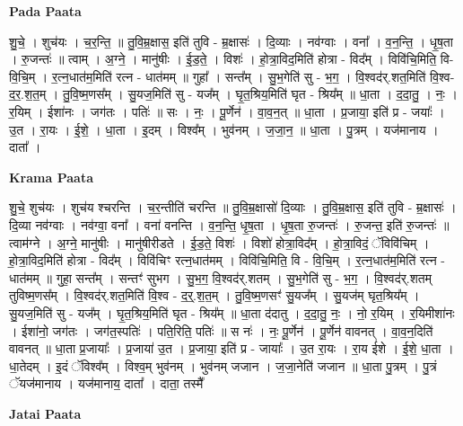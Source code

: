 \documentclass[17pt]{extarticle}
\begin{document}
\textbf{Pada Paata} \newline

शु॒चे॒ । शुच॑यः । च॒र॒न्ति॒ ॥ तु॒वि॒म्र॒क्षास॒ इति॑ तुवि - म्र॒क्षासः॑ । दि॒व्याः । नव॑ग्वाः । वना᳚ । व॒न॒न्ति॒ । धृ॒ष॒ता । रु॒जन्तः॑ ॥ त्वाम् । अ॒ग्ने॒ । मानु॑षीः । ई॒ड॒ते॒ । विशः॑ । हो॒त्रा॒विद॒मिति॑ होत्रा - विद᳚म् । विवि॑चि॒मिति॒ वि-वि॒चि॒म् । र॒त्न॒धात॑म॒मिति॑ रत्न - धात॑मम् ॥ गुहा᳚ । सन्त᳚म् । सु॒भ॒गेति॑ सु - भ॒ग॒ । वि॒श्वद॑र्.शत॒मिति॑ वि॒श्व-द॒र॒.श॒त॒म् । तु॒वि॒ष्म॒णस᳚म् । सु॒यज॒मिति॑ सु - यज᳚म् । घृ॒त॒श्रिय॒मिति॑ घृत - श्रिय᳚म् ॥ धा॒ता । द॒दा॒तु॒ । नः॒ । र॒यिम् । ईशा॑नः । जग॑तः । पतिः॑ ॥ सः । नः॒ । पू॒र्णेन॑ । वा॒व॒न॒त् ॥ धा॒ता । प्र॒जाया॒ इति॑ प्र - जयाः᳚ । उ॒त । रा॒यः । ई॒शे॒ । धा॒ता । इ॒दम् । विश्व᳚म् । भुव॑नम् । ज॒जा॒न॒ ॥ धा॒ता । पु॒त्रम् । यज॑मानाय । दाता᳚ ।  \newline


\textbf{Krama Paata} \newline

शु॒चे॒ शुच॑यः । शुच॑य श्चरन्ति । च॒र॒न्तीति॑ चरन्ति ॥ तु॒वि॒म्र॒क्षासो॑ दि॒व्याः । तु॒वि॒म्र॒क्षास॒ इति॑ तुवि - म्र॒क्षासः॑ । दि॒व्या नव॑ग्वाः । नव॑ग्वा॒ वना᳚ । वना॑ वनन्ति । व॒न॒न्ति॒ धृ॒ष॒ता । धृ॒ष॒ता रु॒जन्तः॑ । रु॒जन्त॒ इति॑ रु॒जन्तः॑ ॥ त्वाम॑ग्ने । अ॒ग्ने॒ मानु॑षीः । मानु॑षीरीडते । ई॒ड॒ते॒ विशः॑ । विशो॑ होत्रा॒विद᳚म् । हो॒त्रा॒विदं॒ ॅविवि॑चिम् । हो॒त्रा॒विद॒मिति॑ होत्रा - विद᳚म् । विवि॑चिꣳ रत्न॒धात॑मम् । विवि॑चि॒मिति॒ वि - वि॒चि॒म् । र॒त्न॒धात॑म॒मिति॑ रत्न - धात॑मम् ॥ गुहा॒ सन्त᳚म् । सन्तꣳ॑ सुभग । सु॒भ॒ग॒ वि॒श्वद॑र्.शतम् । सु॒भ॒गेति॑ सु - भ॒ग॒ । वि॒श्वद॑र्.शतम् तुविष्म॒णस᳚म् । वि॒श्वद॑र्.शत॒मिति॑ वि॒श्व - द॒र्॒.श॒त॒म् । तु॒वि॒ष्म॒णसꣳ॑ सु॒यज᳚म् । सु॒यज॑म् घृत॒श्रिय᳚म् । सु॒यज॒मिति॑ सु - यज᳚म् । घृ॒त॒श्रिय॒मिति॑ घृत - श्रिय᳚म् ॥ धा॒ता द॑दातु । द॒दा॒तु॒ नः॒ । नो॒ र॒यिम् । र॒यिमीशा॑नः । ईशा॑नो॒ जग॑तः । जग॑त॒स्पतिः॑ । पति॒रिति॒ पतिः॑ ॥ स नः॑ । नः॒ पू॒र्णेन॑ । पू॒र्णेन॑ वावनत् । वा॒व॒न॒दिति॑ वावनत् ॥ धा॒ता प्र॒जायाः᳚ । प्र॒जाया॑ उ॒त । प्र॒जाया॒ इति॑ प्र - जायाः᳚ । उ॒त रा॒यः । रा॒य ई॑शे । ई॒शे॒ धा॒ता । धा॒तेदम् । इ॒दं ॅविश्व᳚म् । विश्व॒म् भुव॑नम् । भुव॑नम् जजान । ज॒जा॒नेति॑ जजान ॥ धा॒ता पु॒त्रम् । पु॒त्रं ॅयज॑मानाय । यज॑मानाय॒ दाता᳚ । दाता॒ तस्मै᳚ \newline

\textbf{Jatai Paata} \newline
\end{document}
